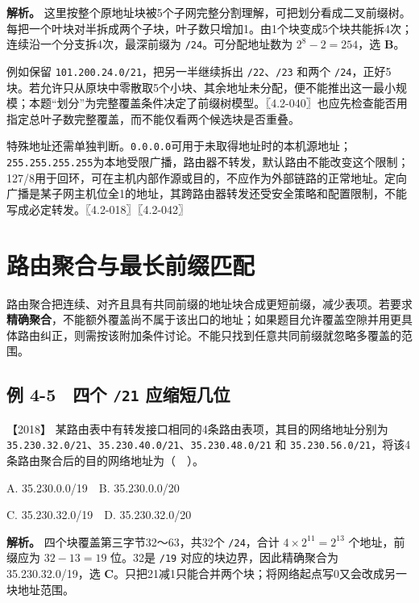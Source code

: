 \textbf{解析。} 这里按整个原地址块被5个子网完整分割理解，可把划分看成二叉前缀树。每把一个叶块对半拆成两个子块，叶子数只增加1。由1个块变成5个块共能拆4次；连续沿一个分支拆4次，最深前缀为 \allowbreak{}\texttt{/24}。可分配地址数为 \(2^8-2=254\)，选 \textbf{B}。

例如保留 \allowbreak{}\texttt{101.200.24.0/21}，把另一半继续拆出 \allowbreak{}\texttt{/22}、\allowbreak{}\texttt{/23} 和两个 \allowbreak{}\texttt{/24}，正好5块。若允许只从原块中零散取5个小块、其余地址未分配，便不能推出这一最小规模；本题``划分''为完整覆盖条件决定了前缀树模型。〖4.2-040〗也应先检查能否用指定总叶子数完整覆盖，而不能仅看两个候选块是否重叠。

特殊地址还需单独判断。\allowbreak{}\texttt{0.0.0.0}可用于未取得地址时的本机源地址；\allowbreak{}\texttt{255.255.255.255}为本地受限广播，路由器不转发，默认路由不能改变这个限制；127/8用于回环，可在主机内部作源或目的，不应作为外部链路的正常地址。定向广播是某子网主机位全1的地址，其跨路由器转发还受安全策略和配置限制，不能写成必定转发。〖4.2-018〗〖4.2-042〗

\section{路由聚合与最长前缀匹配}\label{cn-04-09}

路由聚合把连续、对齐且具有共同前缀的地址块合成更短前缀，减少表项。若要求\textbf{精确聚合}，不能额外覆盖尚不属于该出口的地址；如果题目允许覆盖空隙并用更具体路由纠正，则需按该附加条件讨论。不能只找到任意共同前缀就忽略多覆盖的范围。

\subsection{\texorpdfstring{例 4-5　四个 \allowbreak{}\texttt{/21} 应缩短几位}{例 4-5　四个 /21 应缩短几位}}\label{cn-ex4-5}

\noindent{}【2018】 某路由表中有转发接口相同的4条路由表项，其目的网络地址分别为 \allowbreak{}\texttt{35.230.32.0/21}、\allowbreak{}\texttt{35.230.40.0/21}、\allowbreak{}\texttt{35.230.48.0/21} 和 \allowbreak{}\texttt{35.230.56.0/21}，将该4条路由聚合后的目的网络地址为（　）。

A. 35.230.0.0/19　B. 35.230.0.0/20

C. 35.230.32.0/19　D. 35.230.32.0/20


\textbf{解析。} 四个块覆盖第三字节32～63，共32个 \allowbreak{}\texttt{/24}，合计 \(4\times2^{11}=2^{13}\) 个地址，前缀应为 \(32-13=19\) 位。32是 \allowbreak{}\texttt{/19} 对应的块边界，因此精确聚合为35.230.32.0/19，选 \textbf{C}。只把21减1只能合并两个块；将网络起点写0又会改成另一块地址范围。

